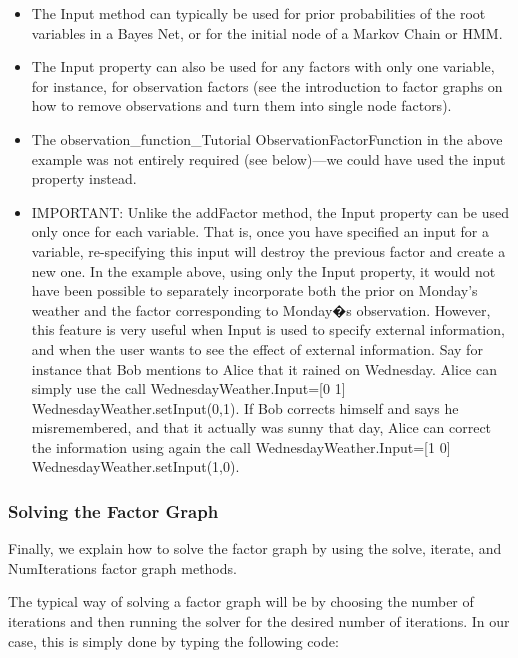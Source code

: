 \begin{itemize}
\item The Input method can typically be used for prior probabilities of the root variables in a Bayes Net, or for the initial node of a Markov Chain or HMM.
\item The Input property can also be used for any factors with only one variable, for instance, for observation factors (see the introduction to factor graphs on how to remove observations and turn them into single node factors).
\item The \ifmatlab observation\_function\_Tutorial \fi \ifjava ObservationFactorFunction \fi in the above example was not entirely required (see below)---we could have used the input property instead.
\item IMPORTANT: Unlike the addFactor method, the Input property can be used only once for each variable. That is, once you have specified an input for a variable, re-specifying this input will destroy the previous factor and create a new one. In the example above, using only the Input property, it would not have been possible to separately incorporate both the prior on Monday's weather and the factor corresponding to Monday�s observation. However, this feature is very useful when Input is used to specify external information, and when the user wants to see the effect of external information. Say for instance that Bob mentions to Alice that it rained on Wednesday. Alice can simply use the call \ifmatlab WednesdayWeather.Input=[0 1] \fi \ifjava WednesdayWeather.setInput(0,1)\fi. If Bob corrects himself and says he misremembered, and that it actually was sunny that day, Alice can correct the information using again the call \ifmatlab WednesdayWeather.Input=[1 0] \fi \ifjava WednesdayWeather.setInput(1,0)\fi.
\end{itemize}


\subsubsection*{Solving the Factor Graph}

Finally, we explain how to solve the factor graph by using the solve, iterate, and NumIterations factor graph methods.

The typical way of solving a factor graph will be by choosing the number of iterations and then running the solver for the desired number of iterations. In our case, this is simply done by typing the following code:

\ifmatlab

